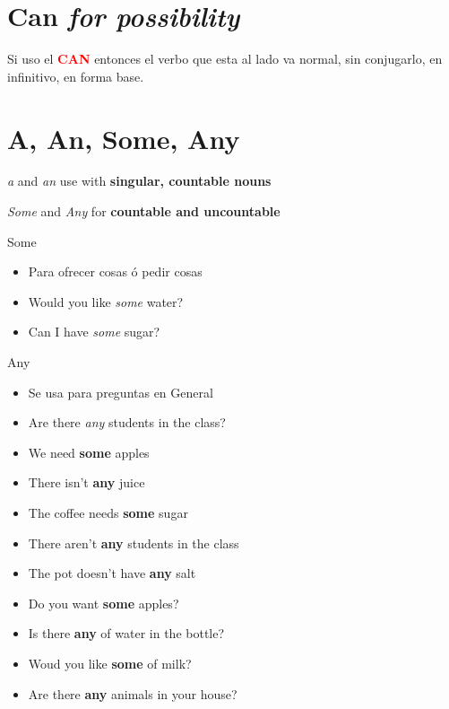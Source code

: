\documentclass{elegantbook}
\begin{document}
        \section{Can \emph{for possibility}}
        \begin{property}
            Si uso el \textcolor{red}{\textbf{CAN}} entonces el verbo que esta al lado va normal, sin conjugarlo, en infinitivo, en forma base.
        \end{property}
        \newpage
        \section{A, An, Some, Any}
        \begin{property}
            \emph{a} and \emph{an} use with \textbf{singular, countable nouns}
        \end{property}
        \begin{property}
            \emph{Some} and \emph{Any} for \textbf{countable and uncountable}
        \end{property}
        \begin{property}
            Some
            \begin{itemize}
                \item Para ofrecer cosas ó pedir cosas
                \item Would you like \emph{some} water?
                \item Can I have \emph{some} sugar?
            \end{itemize}
        \end{property}
        \begin{property}
            Any
            \begin{itemize}
               \item Se usa para preguntas en General 
               \item Are there \emph{any} students in the class? 
            \end{itemize}
        \end{property}
        \begin{example}
            \begin{itemize}
                \item We need \textbf{some} apples
                \item There isn't \textbf{any} juice
                \item The coffee needs \textbf{some} sugar
                \item There aren't \textbf{any} students in the class
                \item The pot doesn't have \textbf{any} salt
                \item Do you want \textbf{some} apples?
                \item Is there \textbf{any} of water in the bottle?
                \item Woud you like \textbf{some} of milk?
                \item Are there \textbf{any} animals in your house?
            \end{itemize}
        \end{example}
\end{document}
